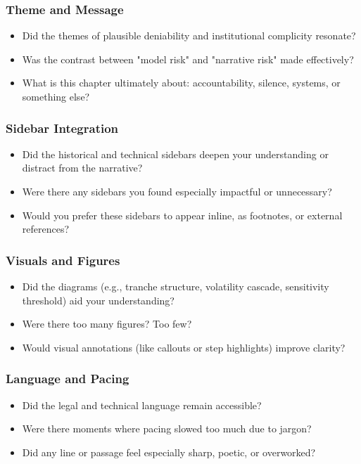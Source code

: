 \subsubsection{Theme and Message}

\begin{itemize}
\item Did the themes of plausible deniability and institutional complicity resonate?
\item Was the contrast between "model risk" and "narrative risk" made effectively?
\item What is this chapter ultimately about: accountability, silence, systems, or something else?
\end{itemize}

\subsubsection{Sidebar Integration}

\begin{itemize}
\item Did the historical and technical sidebars deepen your understanding or distract from the narrative?
\item Were there any sidebars you found especially impactful or unnecessary?
\item Would you prefer these sidebars to appear inline, as footnotes, or external references?
\end{itemize}

\subsubsection{Visuals and Figures}

\begin{itemize}
\item Did the diagrams (e.g., tranche structure, volatility cascade, sensitivity threshold) aid your understanding?
\item Were there too many figures? Too few?
\item Would visual annotations (like callouts or step highlights) improve clarity?
\end{itemize}

\subsubsection{Language and Pacing}

\begin{itemize}
\item Did the legal and technical language remain accessible?
\item Were there moments where pacing slowed too much due to jargon?
\item Did any line or passage feel especially sharp, poetic, or overworked?
\end{itemize}

